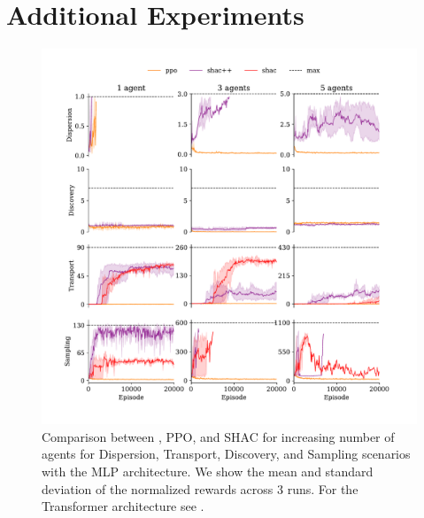 \section{Additional Experiments}



\begin{figure}[t]
    \centering
    \includegraphics[width=\columnwidth]{figs/main-mlp.pdf}
    \caption{Comparison between \fname{}, PPO, and SHAC for increasing number of agents for Dispersion, Transport, Discovery, and Sampling scenarios with the MLP architecture.
    We show the mean and standard deviation of the normalized rewards across $3$ runs. For the Transformer architecture see .
    }
    \label{apx:fig:experiments-mlp}
\end{figure}

